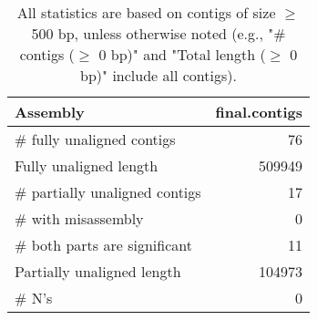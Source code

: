 \documentclass[12pt,a4paper]{article}
\begin{document}
\begin{table}[ht]
\begin{center}
\caption{All statistics are based on contigs of size $\geq$ 500 bp, unless otherwise noted (e.g., "\# contigs ($\geq$ 0 bp)" and "Total length ($\geq$ 0 bp)" include all contigs).}
\begin{tabular}{|l*{1}{|r}|}
\hline
Assembly & final.contigs \\ \hline
\# fully unaligned contigs & 76 \\ \hline
Fully unaligned length & 509949 \\ \hline
\# partially unaligned contigs & 17 \\ \hline
\hspace{5mm}\# with misassembly & 0 \\ \hline
\hspace{5mm}\# both parts are significant & 11 \\ \hline
Partially unaligned length & 104973 \\ \hline
\# N's & 0 \\ \hline
\end{tabular}
\end{center}
\end{table}
\end{document}
